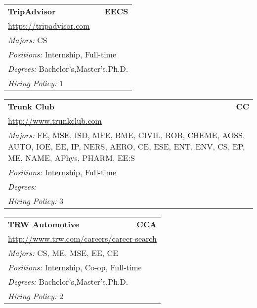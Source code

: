 \documentclass[twoside]{article}
\begin{document}
\begin{center}
\begin{multicols}{3}
\begin{FlushLeft}
\begin{minipage}{.9\columnwidth}
\end{minipage}
 
\begin{minipage}{.9\columnwidth}\begin{tabularx}{.95\columnwidth}{Xr}
                 {\Large\bf TripAdvisor} & {\Large\bf EECS}\\
    \multicolumn{2}{p{.95\columnwidth}}{\url{https://tripadvisor.com}}\\
    \multicolumn{2}{p{.95\columnwidth}}{\emph{Majors:} CS}\\
    \multicolumn{2}{p{.95\columnwidth}}{\emph{Positions:} Internship, Full-time}\\
    \multicolumn{2}{p{.95\columnwidth}}{\emph{Degrees:} Bachelor's,Master's,Ph.D.}\\
    \multicolumn{2}{p{.95\columnwidth}}{\emph{Hiring Policy:} 1}\\
    \end{tabularx}
    
\end{minipage}
 
\begin{minipage}{.9\columnwidth}\begin{tabularx}{.95\columnwidth}{Xr}
                 {\Large\bf Trunk Club} & {\Large\bf CC}\\
    \multicolumn{2}{p{.95\columnwidth}}{\url{http://www.trunkclub.com}}\\
    \multicolumn{2}{p{.95\columnwidth}}{\emph{Majors:} FE, MSE, ISD, MFE, BME, CIVIL, ROB, CHEME, AOSS, AUTO, IOE, EE, IP, NERS, AERO, CE, ESE, ENT, ENV, CS, EP, ME, NAME, APhys, PHARM, EE:S}\\
    \multicolumn{2}{p{.95\columnwidth}}{\emph{Positions:} Internship, Full-time}\\
    \multicolumn{2}{p{.95\columnwidth}}{\emph{Degrees:} }\\
    \multicolumn{2}{p{.95\columnwidth}}{\emph{Hiring Policy:} 3}\\
    \end{tabularx}
    
\end{minipage}
 
\begin{minipage}{.9\columnwidth}\begin{tabularx}{.95\columnwidth}{Xr}
                 {\Large\bf TRW Automotive} & {\Large\bf CCA}\\
    \multicolumn{2}{p{.95\columnwidth}}{\url{http://www.trw.com/careers/career-search}}\\
    \multicolumn{2}{p{.95\columnwidth}}{\emph{Majors:} CS, ME, MSE, EE, CE}\\
    \multicolumn{2}{p{.95\columnwidth}}{\emph{Positions:} Internship, Co-op, Full-time}\\
    \multicolumn{2}{p{.95\columnwidth}}{\emph{Degrees:} Bachelor's,Master's,Ph.D.}\\
    \multicolumn{2}{p{.95\columnwidth}}{\emph{Hiring Policy:} 2}\\
    \end{tabularx}
    

\end{minipage}
\end{FlushLeft}
\end{multicols}
\end{center}
\end{document}
